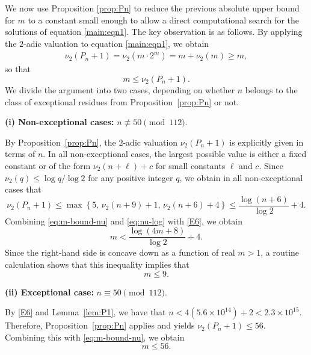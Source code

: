 \documentclass[11pt,a4paper]{article}
\numberwithin{equation}{section}
\numberwithin{table}{section}
\numberwithin{figure}{section}
\begin{document}
We now use Proposition \ref{prop:Pn} to reduce the previous absolute upper bound for $m$ to a constant small enough to allow a direct computational search for the solutions of equation \eqref{main:eqn1}. The key observation is as follows. By applying the $2$-adic 
valuation to equation \eqref{main:eqn1}, we obtain
\begin{align*}
	\nu_2(P_n + 1) = \nu_2(m\cdot 2^m) 
	= m + \nu_2(m) \ge m,
\end{align*}
so that
\begin{equation}\label{eq:m-bound-nu}
	m \le \nu_2(P_n+1).
\end{equation}
We divide the argument into two cases, depending on whether 
$n$ belongs to the class of exceptional residues from 
Proposition~\ref{prop:Pn} or not.

\medskip
\noindent\textbf{(i) Non-exceptional cases:} 
$n\not\equiv 50\pmod{112}$.

By Proposition~\ref{prop:Pn}, the $2$-adic valuation 
$\nu_2(P_n+1)$ is explicitly given in terms of $n$. 
In all non-exceptional cases, the largest possible 
value is either a fixed constant or of the form 
$\nu_2(n+\ell)+c$ for small constants $\ell$ and $c$. 
Since $\nu_2(q) \le \log q/\log 2$ for any positive 
integer $q$, we obtain in all non-exceptional cases
that
\begin{equation}\label{eq:nu-log}
	\nu_2(P_n+1) \le 
	\max\left\{5,\, \nu_2(n+9)+1,\, 
	\nu_2(n+6)+4\right\} 
	\le \frac{\log(n+6)}{\log 2}+4.
\end{equation}
Combining \eqref{eq:m-bound-nu} and \eqref{eq:nu-log} 
with \eqref{E6}, 
we obtain
\begin{equation*}
	m < \frac{\log(4m+8)}{\log 2}+4.
\end{equation*}
Since the right-hand side is concave down as a
function of real $m>1$, a 
routine calculation shows that this inequality implies that
\begin{equation*}
	m \le 9.
\end{equation*}

\medskip
\noindent\textbf{(ii) Exceptional case:} 
$n\equiv 50\pmod{112}$.

By \eqref{E6} and Lemma~\ref{lem:P1}, we have that $n <4(5.6\times 10^{14})+2< 2.3\times 10^{15}$. 
Therefore, Proposition~\ref{prop:Pn} applies and yields 
$\nu_2(P_n+1)\le 56$. Combining this with \eqref{eq:m-bound-nu}, we obtain
\begin{equation*}
	m \le 56.
\end{equation*}
\end{document}
